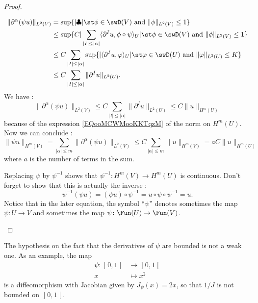 \begin{proof}
\begin{subproof}
\begin{subequations}
\begin{align}
                    \| \partial^{\alpha}(\psi u) \|_{L^2(V)}&=\sup\{ | \clubsuit |\st \phi\in\swD(V)\text{ and }\| \phi \|_{L^2(V)}\leq 1 \}\\
                    &\leq \sup\{ C|\sum_{| I |\leq | \alpha |}\langle \partial^Iu, \phi\circ\psi\rangle_U|\st \phi\in\swD(V)\text{ and }\| \phi \|_{L^2(V)}\leq 1 \}\\
                    &\leq C\sum_{| I |\leq | \alpha |} \sup\{ |\langle \partial^Iu, \varphi\rangle_U|\st \varphi\in\swD(U)\text{ and }\| \varphi \|_{L^2(U)}\leq K  \}\\
                    &\leq C\sum_{| I |\leq | \alpha |}\| \partial^Iu \|_{L^2(U)}.
                \end{align}
            \end{subequations}
            We have :
            \begin{equation}
                \| \partial^{\alpha}(\psi u) \|_{L^2(V)}\leq C\sum_{| I |\leq | \alpha |}\| \partial^Iu \|_{L^2(U)}\leq C\| u \|_{H^m(U)}
            \end{equation}
            because of the expression \eqref{EQooMCWMooKKTqzM} of the norm on \( H^m(U)\). Now we can conclude :
            \begin{equation}
                \| \psi u \|_{H^m(V)}=\sum_{| \alpha |\leq m}\| \partial^{\alpha}(\psi u) \|_{L^2(V)}\leq C\sum_{| \alpha |\leq m}\| u \|_{H^m(V)} = a C\| u  \|_{H^m(U)}
            \end{equation}
            where \( a\) is the number of terms in the sum.

        \item[\( \psi\colon H^m(U)\to H^m(V)\) is a diffeomorphism]

            Replacing \( \psi\) by \( \psi^{-1}\) shows that \( \psi^{-1}\colon H^m(V)\to H^m(U)\) is continuous. Don't forget to show that this is actually the inverse :
            \begin{equation}
                \psi^{-1}(\psi u)=(\psi u)\circ \psi^{-1}=u\circ\psi\circ\psi^{-1}=u.
            \end{equation}
            Notice that in the later equation, the symbol ``$\psi$'' denotes sometimes the map \( \psi\colon U\to V\) and sometimes the map \( \psi\colon \Fun(U)\to \Fun(V)\).
    \end{subproof}
\end{proof}

\begin{remark}
    The hypothesis on the fact that the derivatives of \( \psi\) are bounded is not a weak one. As an example, the map
    \begin{equation}
        \begin{aligned}
        \psi\colon \mathopen] 0 , 1 \mathclose[&\to \mathopen] 0 , 1 \mathclose[ \\
            x&\mapsto x^2 
        \end{aligned}
    \end{equation}
    is a diffeomorphism with Jacobian given by \( J_{\psi}(x)=2x\), so that \( 1/J\) is not bounded on \( \mathopen] 0 , 1 \mathclose[\).
\end{remark}

